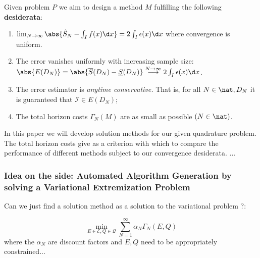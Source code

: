 Given problem $P$ we aim to design a method $M$ fulfilling the following \textbf{desiderata}:
\begin{enumerate}
 \item $\lim_{ N \to \infty} \abs{\hat S_N  - \int_I f(x) \d x} = 2 \int_I \epsilon(x) \d x$ where convergence is uniform. 
 \item The error vanishes uniformly with increasing sample size: $\abs{E (D_N)} = \abs{\overline S(D_N) - \underline S(D_N)} \stackrel{N \to \infty}{\longrightarrow} 2 \int_I \epsilon(x) \d x$. 
\item The error estimator is \textit{anytime conservative.} That is, for all $N \in \nat, D_N$ it is guaranteed that $\mathcal I \in E (D_N)$;
\item The total horizon costs $\Gamma_N (M)$  are as small as possible $(N \in \nat)$. 

 \end{enumerate}

In this paper we will develop solution methods for our given quadrature problem. The total horizon costs give as a criterion with which to compare the performance of different methods subject to our convergence desiderata. ...




\subsubsection{Idea on the side: Automated Algorithm Generation by solving a Variational Extremization Problem}
Can we just find a solution method as a solution to the variational problem ?:

\[ \min_{E \in \mathcal E,Q \in \mathcal Q} \sum_{N=1}^\infty \alpha_N \Gamma_N(E,Q) \] where the $\alpha_N$ are discount factors and $E,Q$ need to be appropriately constrained...

